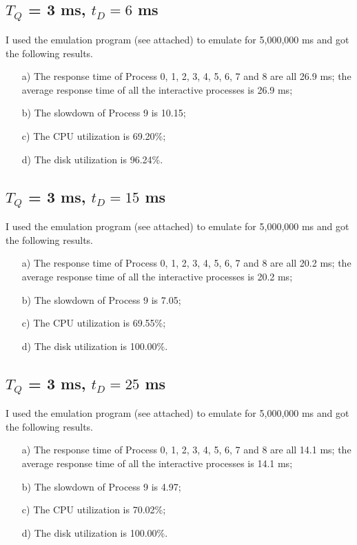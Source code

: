 \documentclass[12pt,letterpaper]{article}
\begin{document}
\subsection{$T_Q$ = 3 ms, $t_D=6$ ms}
I used the emulation program (see attached) to emulate for 5,000,000 ms and got the following results.
\begin{enumerate}
\item[a)] The response time of Process 0, 1, 2, 3, 4, 5, 6, 7 and 8 are all 26.9 ms; the average response time of all the interactive processes is 26.9 ms;
\item[b)] The slowdown of Process 9 is 10.15;
\item[c)] The CPU utilization is 69.20\%;
\item[d)] The disk utilization is 96.24\%.
\end{enumerate}

\subsection{$T_Q$ = 3 ms, $t_D=15$ ms}
I used the emulation program (see attached) to emulate for 5,000,000 ms and got the following results.
\begin{enumerate}
\item[a)] The response time of Process 0, 1, 2, 3, 4, 5, 6, 7 and 8 are all 20.2 ms; the average response time of all the interactive processes is 20.2 ms;
\item[b)] The slowdown of Process 9 is 7.05;
\item[c)] The CPU utilization is 69.55\%;
\item[d)] The disk utilization is 100.00\%.
\end{enumerate}

\subsection{$T_Q$ = 3 ms, $t_D=25$ ms}
I used the emulation program (see attached) to emulate for 5,000,000 ms and got the following results.
\begin{enumerate}
\item[a)] The response time of Process 0, 1, 2, 3, 4, 5, 6, 7 and 8 are all 14.1 ms; the average response time of all the interactive processes is 14.1 ms;
\item[b)] The slowdown of Process 9 is 4.97;
\item[c)] The CPU utilization is 70.02\%;
\item[d)] The disk utilization is 100.00\%.
\end{enumerate}
\end{document}

